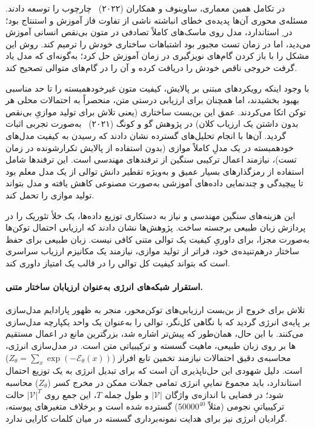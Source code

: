 در تکامل همین معماری، ساوینوف و همکاران (۲۰۲۲)~\cite{savinov2022stepunrolled} چارچوب  را توسعه دادند. مسئله‌ی محوری آن‌ها پدیده‌ی خطای انباشته ناشی از تفاوت فاز آموزش و استنتاج بود؛ در ِ استاندارد، مدل روی ماسک‌های کاملاً تصادفی در متون بی‌نقص انسانی آموزش می‌دید، اما در زمان تست مجبور بود اشتباهات ساختاری خودش را ترمیم کند. روش  این مشکل را با باز کردن گام‌های نویزگیری در زمان آموزش حل کرد؛ به‌گونه‌ای که مدل یاد گرفت خروجی ناقص خودش را دریافت کرده و آن را در گام‌های متوالی تصحیح کند.

با وجود اینکه رویکردهای مبتنی بر پالایش، کیفیت متون غیرخودهمبسته را تا حد مناسبی بهبود بخشیدند، اما همچنان برای ارزیابی درستی متن، منحصراً به احتمالات محلی هر توکن اتکا می‌کردند. عمق این بن‌بست ساختاری (یعنی تلاش برای تولید موازیِ بی‌نقص بدون داشتن یک ارزیاب کلان) در پژوهش گو و کونگ (۲۰۲۱)~\cite{gu2021fully} به‌صورت تجربی اثبات گردید. آن‌ها با انجام تحلیل‌های گسترده نشان دادند که رسیدن به کیفیت مدل‌های خودهمبسته در یک مدلِ کاملاً موازی (بدون استفاده از پالایش تکرارشونده در زمان تست)، نیازمند اعمال ترکیبی سنگین از ترفندهای مهندسی است. این ترفندها شامل استفاده از رمزگذارهای بسیار عمیق و به‌ویژه تقطیر دانش توالی از یک مدل معلم بود تا پیچیدگی و چندنمایی داده‌های آموزشی به‌صورت مصنوعی کاهش یافته و مدل بتواند تولید موازی را تحمل کند.

این هزینه‌های سنگین مهندسی و نیاز به دستکاری توزیع داده‌ها، یک خلأ تئوریک را در پردازش زبان طبیعی برجسته ساخت. پژوهش‌ها نشان دادند که ارزیابی احتمال توکن‌ها به‌صورت مجزا، برای داوریِ کیفیت یک توالی متنی کافی نیست. زبان طبیعی برای حفظ ساختار درهم‌تنیده‌ی خود، فراتر از تولید موازی، نیازمند یک مکانیزم ارزیاب سراسری است که بتواند کیفیت کل توالی را در قالب یک امتیاز داوری کند.


\paragraph{استقرار شبکه‌های انرژی به‌عنوان ارزیابان ساختار متنی.}

تلاش برای خروج از بن‌بست ارزیابی‌های توکن‌محور، منجر به ظهور پارادایم مدل‌سازی بر پایه‌ی انرژی گردید که با نگاهی کل‌نگر، توالی را به‌عنوان یک واحد یکپارچه مدل‌سازی می‌کنند. با این حال، همان‌طور که پیش‌تر اشاره شد، بزرگترین مانع در اعمال مستقیم ها بر روی زبان طبیعی، ماهیت گسسته و ترکیبیاتی متن است. در مدل‌سازی انرژی، محاسبه‌ی دقیق احتمالات نیازمند تخمین تابع افراز ($Z_\theta = \sum_x \exp(-\mathcal{E}_\theta(x))$) است. دلیل شهودی این حل‌ناپذیری آن است که برای تبدیل انرژی به یک توزیع احتمال استاندارد، باید مجموع نماییِ انرژی تمامی جملات ممکن در مخرج کسر ($Z_\theta$) محاسبه شود؛ در فضایی با اندازه‌ی واژگان $|\mathcal{V}|$ و طول جمله $T$، این جمع روی $|\mathcal{V}|^T$ حالت ترکیبیاتیِ نجومی (مثلاً $50000^{40}$) گسترده شده است و برخلاف متغیرهای پیوسته، گرادیان انرژی نیز برای هدایت نمونه‌برداری گسسته در میان کلمات کارایی ندارد.

